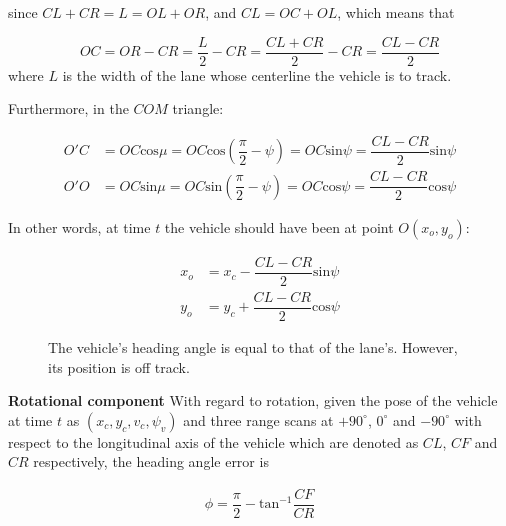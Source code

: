 \documentclass[oneside,12pt]{article}
\begin{document}
    since $CL + CR = L = OL + OR$, and $CL = OC + OL$, which means that

    \begin{equation}
      OC = OR - CR = \dfrac{L}{2} - CR = \dfrac{CL + CR}{2} - CR = \dfrac{CL-CR}{2}
    \end{equation}
    where $L$ is the width of the lane whose centerline the vehicle is to track.

    Furthermore, in the $COM$ triangle:

    \begin{align}
      O'C &= OC \text{cos}\mu = OC \text{cos}(\dfrac{\pi}{2} - \psi) = OC \text{sin}\psi = \dfrac{CL-CR}{2} \text{sin}\psi\\
      O'O &= OC \text{sin}\mu = OC \text{sin}(\dfrac{\pi}{2} - \psi) = OC \text{cos}\psi = \dfrac{CL-CR}{2} \text{cos}\psi
    \end{align}

    In other words, at time $t$ the vehicle should have been at point $O(x_o, y_o)$:

    \begin{align}
      x_o &=x_c - \dfrac{CL-CR}{2}\text{sin}\psi \\
      y_o &=y_c + \dfrac{CL-CR}{2}\text{cos}\psi
    \end{align}

    \begin{figure}[H]\centering
      \scalebox{1}{}
      \caption{The vehicle's heading angle is equal to that of the lane's.
        However, its position is off track.}
      \label{}
    \end{figure}

    \begin{figure}[H]\centering
      \scalebox{1}{}
      \caption{}
      \label{}
    \end{figure}

    \textbf{Rotational component} With regard to rotation, given the pose of
    the vehicle at time $t$ as $(x_c, y_c, v_c, \psi_v)$ and three range scans
    at $+90^\circ$, $0^\circ$ and $-90^\circ$ with respect to the longitudinal
    axis of the vehicle which are denoted as $CL$, $CF$ and $CR$ respectively,
    the heading angle error is

    \begin{align}
      \phi = \dfrac{\pi}{2} - \text{tan}^{-1}\dfrac{CF}{CR}
    \end{align}
\end{document}
